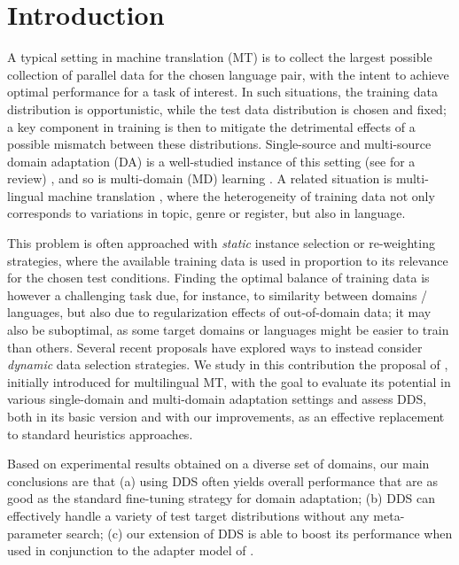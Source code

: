 \documentclass[11pt,a4paper]{article}
\newcommand{\fyTodo}[1]{\Todo[FY:]{\textcolor{orange}{#1}}}
\begin{document}
\section{Introduction}\label{sec:intro}
A typical setting in machine translation (MT) is to collect the largest possible collection of parallel data for the chosen language pair, with the intent to achieve optimal performance for a task of interest. In such situations, the training data distribution is opportunistic, while the test data distribution is chosen and fixed; a key component in training is then to mitigate the detrimental effects of a possible mismatch between these distributions. Single-source and multi-source domain adaptation (DA) is a well-studied instance of this setting (see \cite{Chu2017comparison} for a review) , and so is multi-domain (MD) learning \cite{Chu18multilingual,Zeng18multidomain,Jiang19multidomain,Pham21revisiting}. A related situation is multi-lingual machine translation \cite{Firat16multiway,Ha16towards,Johnson17google,Arivazhagan19massively}\fyTodo{Add more recent work}, where the heterogeneity of training data not only corresponds to variations in topic, genre or register, but also in language.

\fyTodo{Label or covariate shift ?}
This problem is often approached with \emph{static} instance selection or re-weighting strategies, where the available training data is used in proportion to its relevance for the chosen test conditions. Finding the optimal balance of training data is however a challenging task due, for instance, to similarity between domains / languages, but also due to regularization effects of out-of-domain data; it may also be suboptimal, as some target domains or languages might be easier to train than others. Several recent proposals \cite{Wang17instance,Kumar19reinforcement,Wang20learning-multi} have explored ways to instead consider \emph{dynamic} data selection strategies. We study in this contribution the proposal of \citet{Wang20balancing}, initially introduced for multilingual MT, with the goal to evaluate its potential in various single-domain and multi-domain adaptation settings and assess DDS, both in its basic version and with our improvements, as an effective replacement to standard heuristics approaches.

Based on experimental results obtained on a diverse set of domains, our main conclusions are that (a) using DDS often yields overall performance that are as good as the standard fine-tuning strategy for domain adaptation; (b) DDS can effectively handle a variety of test target distributions without any meta-parameter search; (c) our extension of DDS is able to boost its performance when used in conjunction to the adapter model of \citet{Bapna19simple}.
\end{document}
